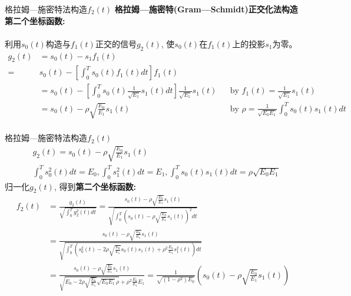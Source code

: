 \begin{frame}[shrink]{格拉姆---施密特法构造$f_2(t)$}
\textbf{格拉姆---施密特(Gram---Schmidt)正交化法构造第二个坐标函数: }\\
~\\
利用$s_0(t)$构造与$f_1(t)$正交的信号$g_2(t)$, 使$s_0(t)$在$f_1(t)$上的投影$s_1$为零。\\
\begin{align*}
g_2(t)&=s_0(t)-s_1f_1(t)\\
=&s_0(t)-\left[\int_{0}^{T}s_0(t)f_1(t)dt\right]f_1(t)\\
&=s_0(t)-\left[\int_{0}^{T}s_0(t)\frac{1}{\sqrt{E_1}}s_1(t)dt\right]\frac{1}{\sqrt{E_1}}s_1(t) &&\text{by }f_1(t)=\frac{1}{\sqrt{E_1}}s_1(t)\\
&=s_0(t)-\rho\sqrt{\frac{E_0}{E_1}}s_1(t) &&\text{by }\rho=\frac{1}{\sqrt{E_{0}E_{1}}}\int_{0}^{T}s_0(t)s_1(t)dt\\
\end{align*}
\end{frame}

\begin{frame}[shrink]{格拉姆---施密特法构造$f_2(t)$}
\begin{align*}
&g_2(t)=s_0(t)-\rho\sqrt{\frac{E_0}{E_1}}s_1(t)\\
&\int_{0}^{T}s_0^2(t)dt=E_0, \int_{0}^{T}s_1^2(t)dt=E_1, \int_{0}^{T}s_0(t)s_1(t)dt=\rho\sqrt{E_0E_1}
\end{align*}
归一化$g_2(t)$, 得到\textbf{第二个坐标函数:}
\begin{align*}
f_2(t)&=\frac{g_2(t)}{\sqrt{\int_{0}^{T}g_2^2(t)dt}}=\frac{s_0(t)-\rho\sqrt{\frac{E_0}{E_1}}s_1(t)}{\sqrt{\int_{0}^{T}\left(s_0(t)-\rho\sqrt{\frac{E_0}{E_1}}s_1(t)\right)^2dt}}\\
&=\frac{s_0(t)-\rho\sqrt{\frac{E_0}{E_1}}s_1(t)}{\sqrt{\int_{0}^{T}\left(s_0^2(t)-2\rho\sqrt{\frac{E_0}{E_1}}s_0(t)s_1(t)+\rho^2\frac{E_0}{E_1}s_1^2(t)\right)dt}}\\
&=\frac{s_0(t)-\rho\sqrt{\frac{E_0}{E_1}}s_1(t)}{\sqrt{E_0-2\rho\sqrt{\frac{E_0}{E_1}}\sqrt{E_0E_1}\rho}+\rho^2\frac{E_0}{E_1}E_1}
=\frac{1}{\sqrt{(1-\rho^2)E_0}}\left(s_0(t)-\rho\sqrt{\frac{E_0}{E_1}}s_1(t)\right)
\end{align*}
\end{frame}


